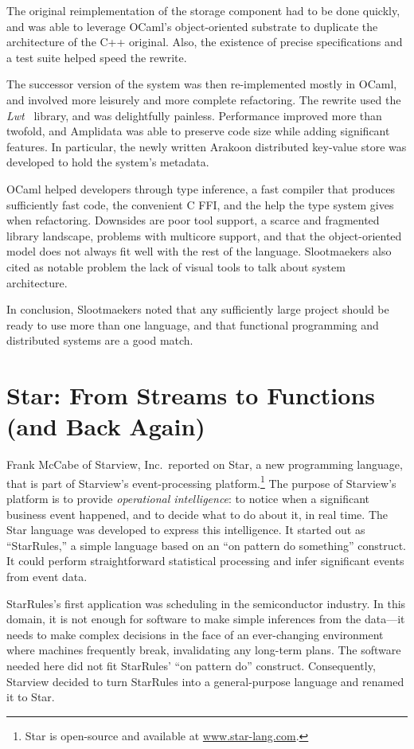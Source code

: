 \documentclass{jfp1}
\begin{document}
The original reimplementation of the storage component had to be done
quickly, and was able to leverage OCaml's object-oriented substrate to
duplicate the architecture of the C++ original.  Also, the existence
of precise specifications and a test suite helped speed the rewrite.

The successor version of the system was then re-implemented mostly in
OCaml, and involved more leisurely and more complete refactoring.  The
rewrite used the \textit{Lwt}~\cite{Vouillon:2008:LCT:1411304.1411307}
library, and was delightfully painless.  Performance improved more
than twofold, and Amplidata was able to preserve code size while
adding significant features.  In particular, the newly written Arakoon
distributed key-value store was developed to hold the system's metadata.

OCaml helped developers through type inference, a fast compiler that
produces sufficiently fast code, the convenient C FFI, and the help
the type system gives when refactoring.  Downsides are poor tool
support, a scarce and fragmented library landscape, problems with
multicore support, and that the object-oriented model does not always fit
well with the rest of the language.  Slootmaekers also cited as notable
problem the lack
of visual tools to talk about system architecture.

In conclusion, Slootmaekers noted that any sufficiently large project
should be ready to use more than one language, and that functional
programming and distributed systems are a good match.

\section{Star: From Streams to Functions (and Back Again)}

Frank McCabe of Starview, Inc.\ reported on Star, a new programming
language, that is part of Starview's event-processing platform.\footnote{Star
is open-source and available at \url{www.star-lang.com}.}  The
purpose of Starview's platform is to provide \textit{operational
  intelligence}: to notice when a significant business event happened,
and to decide what to do about it, in real time.  The Star language
was developed to express this intelligence.  It started out as
``StarRules,'' a simple language based on an ``on pattern do
something'' construct.  It could perform straightforward statistical
processing and infer significant events from event data.

StarRules's first application was scheduling in the semiconductor
industry.  In this domain, it is not enough for software to make
simple inferences from the data---it needs to make complex decisions in
the face of an ever-changing environment where machines frequently
break, invalidating any long-term plans.  The software needed here did
not fit StarRules' ``on pattern do'' construct.  Consequently,
Starview decided to turn StarRules into a general-purpose language
and renamed it to Star.
\end{document}
